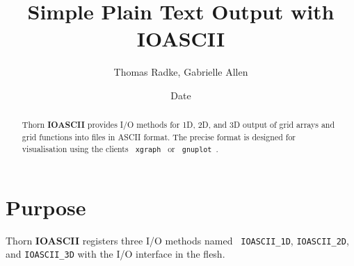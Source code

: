 \documentclass{article}
\begin{document}
\title{Simple Plain Text Output with IOASCII}
\author{Thomas Radke, Gabrielle Allen}
\date{$ $Date$ $}

\maketitle


\begin{abstract}
Thorn {\bf IOASCII} provides I/O methods for 1D, 2D, and 3D output of
grid arrays and grid functions into files in ASCII format. The precise
format is designed for visualisation using the clients {\tt
xgraph}~\cite{cactusbase_ioascii_xgraph} or {\tt
gnuplot}~\cite{cactusbase_ioascii_gnuplot}.
\end{abstract}

\section{Purpose}
Thorn {\bf IOASCII} registers three I/O methods named {\tt
IOASCII\_1D}, {\tt IOASCII\_2D}, and {\tt IOASCII\_3D} with the I/O
interface in the flesh.
\end{document}
